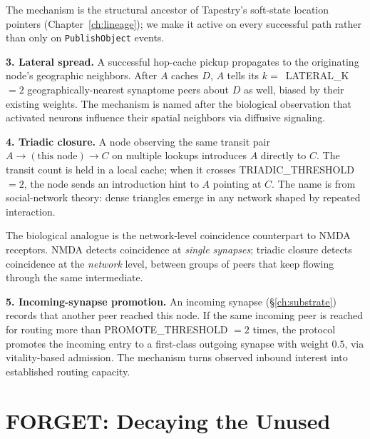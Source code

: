 \documentclass[twoside,nobib]{tufte-book}
\begin{document}
The mechanism is the structural ancestor of Tapestry's soft-state
location pointers (Chapter~\ref{ch:lineage}); we make it active
on every successful path rather than only on
\texttt{PublishObject} events.

\textbf{3. Lateral spread.} A successful hop-cache pickup
propagates to the originating node's geographic neighbors. After
$A$ caches $D$, $A$ tells its $k =$~\textsc{LATERAL\_K} $= 2$
geographically-nearest synaptome peers about $D$ as well, biased
by their existing weights. The mechanism is named after the
biological observation that activated neurons influence their
spatial neighbors via diffusive signaling.

\textbf{4. Triadic closure.} A node observing the same transit
pair $A \to (\text{this node}) \to C$ on multiple lookups
introduces $A$ directly to $C$. The transit count is held in a
local cache; when it crosses
\textsc{TRIADIC\_THRESHOLD}~$=2$, the node sends an introduction
hint to $A$ pointing at $C$. The name is from social-network
theory: dense triangles emerge in any network shaped by
repeated interaction.

The biological analogue is the network-level coincidence
counterpart to NMDA receptors. NMDA detects coincidence at
\emph{single synapses}; triadic closure detects coincidence at the
\emph{network} level, between groups of peers that keep flowing
through the same intermediate.

\textbf{5. Incoming-synapse promotion.} An incoming synapse
(\S\ref{ch:substrate}) records that another peer reached this
node. If the same incoming peer is reached for routing more than
\textsc{PROMOTE\_THRESHOLD} $= 2$ times, the protocol promotes
the incoming entry to a first-class outgoing synapse with weight
$0.5$, via vitality-based admission. The mechanism turns observed
inbound interest into established routing capacity.

\section{FORGET: Decaying the Unused}
\label{sec:forget}
\end{document}
